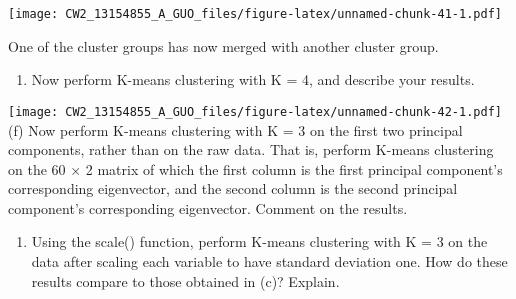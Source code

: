 \documentclass[]{article}
\newenvironment{Shaded}{\begin{snugshade}}{\end{snugshade}}
\newcommand{\KeywordTok}[1]{\textcolor[rgb]{0.13,0.29,0.53}{\textbf{#1}}}
\newcommand{\DataTypeTok}[1]{\textcolor[rgb]{0.13,0.29,0.53}{#1}}
\newcommand{\DecValTok}[1]{\textcolor[rgb]{0.00,0.00,0.81}{#1}}
\newcommand{\StringTok}[1]{\textcolor[rgb]{0.31,0.60,0.02}{#1}}
\newcommand{\OperatorTok}[1]{\textcolor[rgb]{0.81,0.36,0.00}{\textbf{#1}}}
\newcommand{\NormalTok}[1]{#1}
\providecommand{\tightlist}{%
  \setlength{\itemsep}{0pt}\setlength{\parskip}{0pt}}
\begin{document}
\begin{Shaded}
\end{Shaded}

\texttt{[image: CW2\_13154855\_A\_GUO\_files/figure-latex/unnamed-chunk-41-1.pdf]}

One of the cluster groups has now merged with another cluster group.

\begin{enumerate}
\def\labelenumi{(\alph{enumi})}
\setcounter{enumi}{4}
\tightlist
\item
  Now perform K-means clustering with K = 4, and describe your results.
\end{enumerate}

\begin{Shaded}
\end{Shaded}

\texttt{[image: CW2\_13154855\_A\_GUO\_files/figure-latex/unnamed-chunk-42-1.pdf]}
(f) Now perform K-means clustering with K = 3 on the first two principal
components, rather than on the raw data. That is, perform K-means
clustering on the 60 × 2 matrix of which the first column is the first
principal component's corresponding eigenvector, and the second column
is the second principal component's corresponding eigenvector. Comment
on the results.

\begin{enumerate}
\def\labelenumi{(\alph{enumi})}
\setcounter{enumi}{6}
\tightlist
\item
  Using the scale() function, perform K-means clustering with K = 3 on
  the data after scaling each variable to have standard deviation one.
  How do these results compare to those obtained in (c)? Explain.
\end{enumerate}
\end{document}
